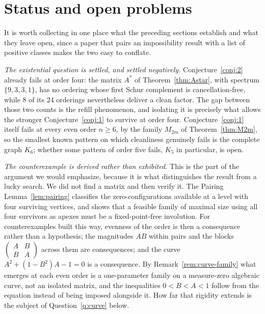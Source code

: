\documentclass[11pt]{article}
\theoremstyle{plain}
\theoremstyle{definition}
\theoremstyle{remark}
\begin{document}
\section{Status and open problems}\label{sec:status}
\begin{humanblock}
It is worth collecting in one place what the preceding sections establish and what they leave open,
since a paper that pairs an impossibility result with a list of positive classes makes the two easy to
conflate.

\emph{The existential question is settled, and settled negatively.} Conjecture~\ref{conj:2} already
fails at order four: the matrix $A^*$ of Theorem~\ref{thm:Astar}, with spectrum $\{9,3,3,1\}$, has no
ordering whose first Schur complement is cancellation-free, while $8$ of its $24$ orderings
nevertheless deliver a clean factor. The gap between those two counts is the refill phenomenon, and
isolating it is precisely what allows the stronger Conjecture~\ref{conj:1} to survive at order four.
Conjecture~\ref{conj:1} itself fails at every even order $n\ge6$, by the family $M_{2m}$ of
Theorem~\ref{thm:M2m}, so the smallest known pattern on which cleanliness genuinely fails is the
complete graph $K_6$; whether some pattern of order five fails, $K_5$ in particular, is open.

\emph{The counterexample is derived rather than exhibited.} This is the part of the argument we would
emphasize, because it is what distinguishes the result from a lucky search. We did not find a matrix
and then verify it. The Pairing Lemma~\ref{lem:pairing} classifies the zero-configurations available at
a level with four surviving vertices, and shows that a feasible family of maximal size using all four
survivors as apexes must be a fixed-point-free involution. For counterexamples built this way,
evenness of the order is then a consequence rather than a hypothesis; the magnitudes $AB$ within pairs and the blocks
$\begin{pmatrix}A&B\\B&A\end{pmatrix}$ across them are consequences; and the curve
$A^2+(1-B^2)A-1=0$ is a consequence. By Remark~\ref{rem:curve-family} what emerges at each even order
is a one-parameter family on a measure-zero algebraic curve, not an isolated matrix, and the
inequalities $0<B<A<1$ follow from the equation instead of being imposed alongside it. How far that
rigidity extends is the subject of Question~\ref{q:curve} below.


\end{humanblock}
\end{document}
